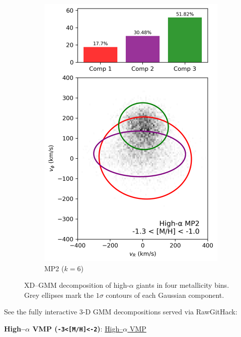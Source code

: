 \documentclass[a4paper,12pt]{article}
\begin{document}
\begin{figure}[H]
\begin{subfigure}{0.245\linewidth}
    \includegraphics[width=\linewidth]{../figures/gmm_mp2_high_alpha_k6.png}
    \caption{MP2 ($k{=}6$)}
    \label{fig:mp2_hi}
  \end{subfigure}

  \caption{XD--GMM decomposition of high-$\alpha$ giants in four metallicity bins. Grey ellipses mark the $1\sigma$ contours of each Gaussian component.}
  \label{fig:gmm_4wide_hi}
\end{figure}

See the fully interactive 3-D GMM decompositions served via RawGitHack:\medskip

\textbf{High–$\alpha$ VMP (\texttt{-3<[M/H]<-2})}:  
\href{https://raw.githack.com/raunaq-rai/Disentangling-the-Milky-Way-using-GMM/main/figures/VMP_high___-3%5BM_H%5D-2.html}{High–$\alpha$ VMP}
\end{document}
